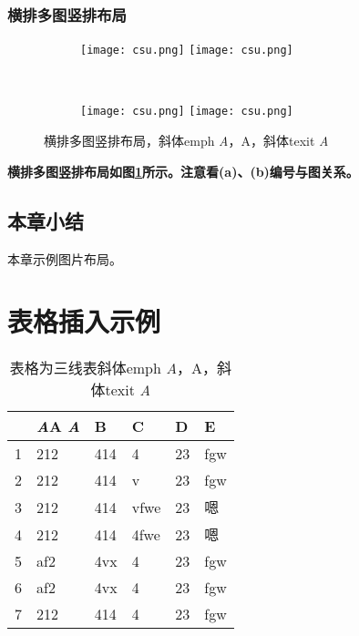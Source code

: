 \subsubsection{横排多图竖排布局}



\begin{figure}[!htb]
    \centering
    \begin{subfigure}[t]{0.3\linewidth}
    	\captionsetup{justification=centering} %
        \begin{minipage}[b]{1\linewidth}
        \texttt{[image: csu.png]}
        \texttt{[image: csu.png]}
        \caption{}
        \end{minipage}
    \end{subfigure}\\
    \begin{subfigure}[t]{0.3\linewidth}
    	\captionsetup{justification=centering} %
        \begin{minipage}[b]{1\linewidth}
        \texttt{[image: csu.png]}
        \texttt{[image: csu.png]}
        \caption{}
        \end{minipage}
    \end{subfigure}
    \caption{横排多图竖排布局，斜体emph \emph{A}，A，斜体texit \textit{A}}
    \label{F.csu_row_col}
\end{figure}

\textbf{横排多图竖排布局如图\ref{F.csu_row_col}所示。注意看(a)、(b)编号与图关系。}

\subsection{本章小结}
本章示例图片布局。

\clearpage


\section{表格插入示例}

\begin{table}[htb]
  \centering
  \caption{表格为三线表斜体emph \emph{A}，A，斜体texit \textit{A}}
  \label{T.example}
  \begin{tabular}{llllll}
  \toprule
    & \emph{A}A \textit{A}  & B  & C  & D  & E \\
  \midrule
1 	& 212 & 414 & 4 		& 23 & fgw	\\
2 	& 212 & 414 & v 		& 23 & fgw	\\
3 	& 212 & 414 & vfwe		& 23 & 嗯	\\
4 	& 212 & 414 & 4fwe		& 23 & 嗯	\\
5 	& af2 & 4vx & 4 		& 23 & fgw	\\
6 	& af2 & 4vx & 4 		& 23 & fgw	\\
7 	& 212 & 414 & 4 		& 23 & fgw	\\
\bottomrule

\end{tabular}
\end{table}

